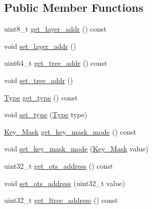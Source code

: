 \subsection*{Public Member Functions}
\begin{DoxyCompactItemize}
\item 
uint8\+\_\+t \mbox{\hyperlink{class_botan_1_1_x_m_s_s___address_ac71959711edb3f719e371942247f2c74}{get\+\_\+layer\+\_\+addr}} () const
\item 
void \mbox{\hyperlink{class_botan_1_1_x_m_s_s___address_aca1e7f785ce8f328bd108c9cd63bde11}{set\+\_\+layer\+\_\+addr}} ()
\item 
uint64\+\_\+t \mbox{\hyperlink{class_botan_1_1_x_m_s_s___address_ac6ffefc09f01cd25f9acb76f6fcd4071}{get\+\_\+tree\+\_\+addr}} () const
\item 
void \mbox{\hyperlink{class_botan_1_1_x_m_s_s___address_af0c3a079be599e10d72e14223f8ea16d}{set\+\_\+tree\+\_\+addr}} ()
\item 
\mbox{\hyperlink{class_botan_1_1_x_m_s_s___address_a0101e45c5608cf312b497bf6d855000e}{Type}} \mbox{\hyperlink{class_botan_1_1_x_m_s_s___address_a278cf3ba854261fd2c73fbc996fb89b1}{get\+\_\+type}} () const
\item 
void \mbox{\hyperlink{class_botan_1_1_x_m_s_s___address_a57148e8e415efce53531406607526236}{set\+\_\+type}} (\mbox{\hyperlink{class_botan_1_1_x_m_s_s___address_a0101e45c5608cf312b497bf6d855000e}{Type}} type)
\item 
\mbox{\hyperlink{class_botan_1_1_x_m_s_s___address_a85146c0c3e049f62c413194049f501e3}{Key\+\_\+\+Mask}} \mbox{\hyperlink{class_botan_1_1_x_m_s_s___address_af74b11e3ced49d405e2c84ca51191d61}{get\+\_\+key\+\_\+mask\+\_\+mode}} () const
\item 
void \mbox{\hyperlink{class_botan_1_1_x_m_s_s___address_a12a0bcf65685053363b944be811f57db}{set\+\_\+key\+\_\+mask\+\_\+mode}} (\mbox{\hyperlink{class_botan_1_1_x_m_s_s___address_a85146c0c3e049f62c413194049f501e3}{Key\+\_\+\+Mask}} value)
\item 
uint32\+\_\+t \mbox{\hyperlink{class_botan_1_1_x_m_s_s___address_a51d64c847fb1ba38a29c24da4b590c83}{get\+\_\+ots\+\_\+address}} () const
\item 
void \mbox{\hyperlink{class_botan_1_1_x_m_s_s___address_a2219e289707137fda458eec819933be9}{set\+\_\+ots\+\_\+address}} (uint32\+\_\+t value)
\item 
uint32\+\_\+t \mbox{\hyperlink{class_botan_1_1_x_m_s_s___address_a67c3f3349ae7545bccf57f6e37f81849}{get\+\_\+ltree\+\_\+address}} () const
\item 

\end{DoxyCompactItemize}
